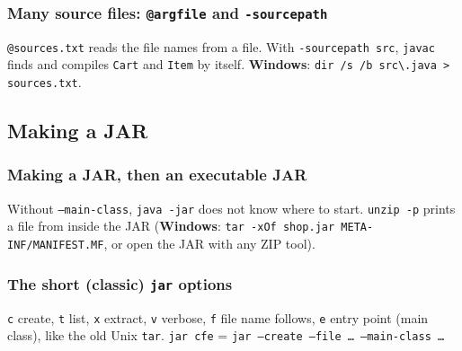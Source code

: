 \documentclass[aspectratio=169,10pt,compress]{beamer}
\newcommand{\win}{\textbf{Windows}}
\begin{document}
\begin{frame}[t,fragile] \frametitle{Many source files: \texttt{@argfile} and \texttt{-sourcepath}}

  \vspace{0.1em}
  \small
  \texttt{@sources.txt} reads the file names from a file. With \texttt{-sourcepath src}, \texttt{javac} finds and compiles
  \texttt{Cart} and \texttt{Item} by itself. \win: \texttt{dir /s /b src\textbackslash *.java > sources.txt}.
\end{frame}


\subsection[Jar]{Making a JAR}




\begin{frame}[t,fragile] \frametitle{Making a JAR, then an executable JAR}

  \vspace{0.1em}
  \small
  Without \texttt{--main-class}, \texttt{java -jar} does not know where to start. \texttt{unzip -p} prints a file from inside the JAR
  (\win: \texttt{tar -xOf shop.jar META-INF/MANIFEST.MF}, or open the JAR with any ZIP tool).
\end{frame}




\begin{frame}[t,fragile] \frametitle{The short (classic) \texttt{jar} options}

  \vspace{0.1em}
  \small
  \texttt{c} create, \texttt{t} list, \texttt{x} extract, \texttt{v} verbose, \texttt{f} file name follows, \texttt{e} entry point (main class),
  like the old Unix \texttt{tar}. \texttt{jar cfe} = \texttt{jar --create --file \dots\ --main-class \dots}
\end{frame}
\end{document}
